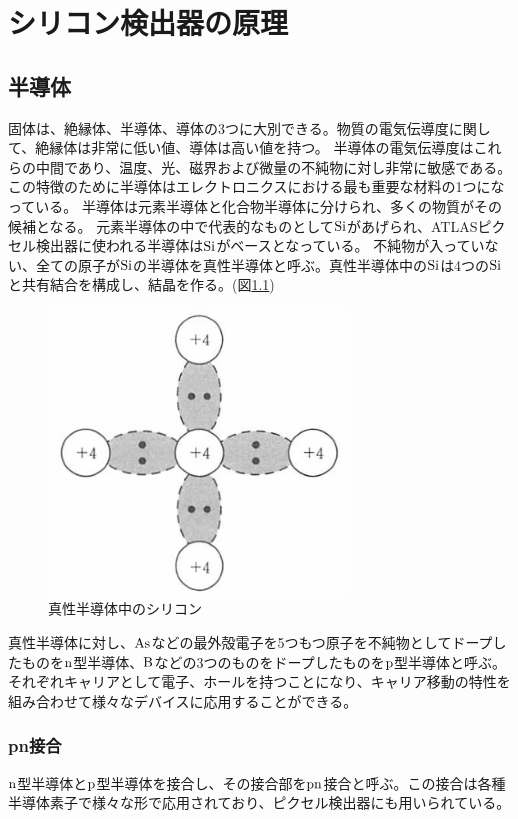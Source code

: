 
\chapter{シリコン検出器の原理}
\section{半導体\cite{2-1}}
固体は、絶縁体、半導体、導体の3つに大別できる。物質の電気伝導度に関して、絶縁体は非常に低い値、導体は高い値を持つ。
半導体の電気伝導度はこれらの中間であり、温度、光、磁界および微量の不純物に対し非常に敏感である。この特徴のために半導体はエレクトロニクスにおける最も重要な材料の1つになっている。
半導体は元素半導体と化合物半導体に分けられ、多くの物質がその候補となる。
元素半導体の中で代表的なものとして$\rm{Si}$があげられ、ATLASピクセル検出器に使われる半導体は$\rm{Si}$がベースとなっている。
不純物が入っていない、全ての原子が$\rm{Si}$の半導体を真性半導体と呼ぶ。真性半導体中の$\rm{Si}$は4つの$\rm{Si}$と共有結合を構成し、結晶を作る。(図\ref{pure_silicon})

\begin{figure}[bpt]\centering
\includegraphics[width=8cm]{pure_silicon}
\caption[真性半導体中のシリコン]{真性半導体中のシリコン\cite{2-1}}
\label{pure_silicon}
\end{figure}

真性半導体に対し、$\rm{As}$などの最外殻電子を5つもつ原子を不純物としてドープしたものを$\rm{n}$型半導体、$\rm{B}$などの3つのものをドープしたものを$\rm{p}$型半導体と呼ぶ。
それぞれキャリアとして電子、ホールを持つことになり、キャリア移動の特性を組み合わせて様々なデバイスに応用することができる。

\subsection{pn接合}
$\rm{n}$型半導体と$\rm{p}$型半導体を接合し、その接合部を$\rm{pn}$接合と呼ぶ。この接合は各種半導体素子で様々な形で応用されており、ピクセル検出器にも用いられている。

